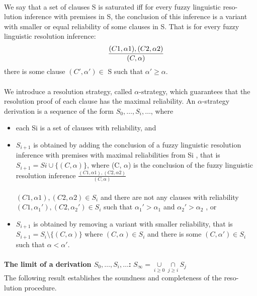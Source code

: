 \documentclass[26pt,fleqn,]{article}
\begin{document}
\paragraph{} 
We say that a set of clauses S is saturated iff for every fuzzy linguistic reso-
lution inference with premises in S, the conclusion of this inference is a variant
with smaller or equal reliability of some clauses in S. That is for every fuzzy
linguistic resolution inference:\\
\[\indent \frac{(C1, \alpha1), (C2, \alpha2)}{(C,\alpha)}
\]
\indent there is some clause \((C',\alpha') \in \) S such that \(\alpha' \ge \alpha\).
\paragraph{} 
We introduce a resolution strategy, called $\alpha$-strategy, which guarantees that
the resolution proof of each clause has the maximal reliability. An $\alpha$-strategy
derivation is a sequence of the form $S_{0},\ldots,S_{i},\ldots$, where
\begin{itemize} 
	\item each Si is a set of clauses with reliability, and
	\item  \(S_{i+1}\) is obtained by adding the conclusion of a fuzzy 
	linguistic resolution inference with premises with maximal reliabilities 
	from Si , that is \(S_{i+1} = Si \cup \{(C, \alpha)\}\), 
	where (C, $\alpha$) is the conclusion of the fuzzy linguistic resolution inference  
	\(\frac{(C1 , \alpha1), (C2 , \alpha2)}	{(C, \alpha)}\)
	\\\\	
	$(C1 , \alpha1 ), (C2 , \alpha2 ) \in S_{i}$ and there are not any clauses 
	with reliability $(C1 , \alpha_{1}' ), (C2 , \alpha_{2}' ) \in S_{i}$ such that
			$\alpha_{1}' > \alpha_{1}$ and $\alpha_{2}' > \alpha_{2}$ , or

		\item $S_{i+1}$ is obtained by removing a variant with smaller 
			reliability, that is $S_{i+1} = S_{i} \setminus \{(C, \alpha)\}$ 
			where $(C, \alpha) \in S_{i}$ and there is some
			$(C, \alpha') \in S_{i}$ such that $\alpha < \alpha'$.
\end{itemize}
\paragraph{} 
{\bfseries The limit of a derivation $S_{0},\ldots,S_{i},\ldots$:} 
$S_{\infty} = \underset{i \ge 0}{\cup} \underset{j \ge i}{\cap}S_{j}$
\\
The following result establishes the soundness and completeness of the reso-
lution procedure.
\end{document}
